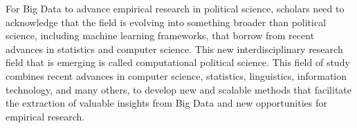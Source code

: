 \documentclass{article}
\begin{document}
For Big Data to advance empirical research in political science, scholars need to acknowledge that the field is evolving into something broader than political science, including machine learning frameworks, that borrow from recent advances in statistics and computer science. This new interdisciplinary research field that is emerging is called computational political science. This field of study combines recent advances in computer science, statistics, linguistics, information technology, and many others, to develop new and scalable methods that facilitate the extraction of valuable insights from Big Data and new opportunities for empirical research.

\newpage


\end{document}
